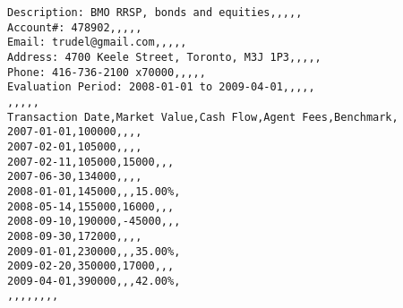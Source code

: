 \begin{verbatim}
Description: BMO RRSP, bonds and equities,,,,,
Account#: 478902,,,,,
Email: trudel@gmail.com,,,,,
Address: 4700 Keele Street, Toronto, M3J 1P3,,,,,
Phone: 416-736-2100 x70000,,,,,
Evaluation Period: 2008-01-01 to 2009-04-01,,,,,
,,,,,
Transaction Date,Market Value,Cash Flow,Agent Fees,Benchmark,
2007-01-01,100000,,,,
2007-02-01,105000,,,,
2007-02-11,105000,15000,,,
2007-06-30,134000,,,,
2008-01-01,145000,,,15.00%,
2008-05-14,155000,16000,,,
2008-09-10,190000,-45000,,,
2008-09-30,172000,,,,
2009-01-01,230000,,,35.00%,
2009-02-20,350000,17000,,,
2009-04-01,390000,,,42.00%,
,,,,,,,,
\end{verbatim}
